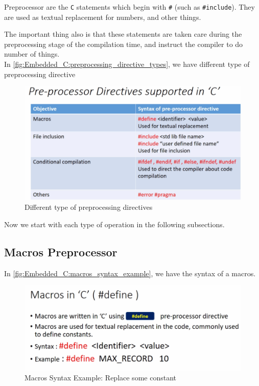 Preprocessor are the \verb|C| statements which begin with \verb|#| (such as \verb|#include|). They are used as textual replacement for numbers, and other things.

The important thing also is that these statements are taken care during the preprocessing stage of the compilation time, and instruct the compiler to do number of things.\\

In \autoref{fig:Embedded_C:preprocessing_directive_types}, we have different type of preprocessing directive

\begin{figure}[h]
\centering
\includegraphics[scale=0.55]{Figures/Embedded_C/preprocessing_directive_types}
\caption{Different type of preprocessing directives}
\label{fig:Embedded_C:preprocessing_directive_types}
\end{figure}

Now we start with each type of operation in the following subsections.

\subsection{Macros Preprocessor}

In \autoref{fig:Embedded_C:macros_syntax_example}, we have the syntax of a macros.

\begin{figure}[h]
\centering
\includegraphics[scale=0.55]{Figures/Embedded_C/macros_syntax_example}
\caption{Macros Syntax Example: Replace some constant}
\label{fig:Embedded_C:macros_syntax_example}
\end{figure}

